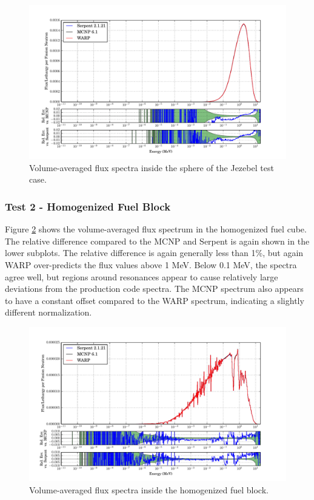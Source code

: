 \documentclass[preprint,12pt]{elsarticle}
\begin{document}
\begin{figure}[h!]
\centering
\includegraphics[width=\textwidth,trim= 1cm 0cm 1cm 0cm]{graphics/jezebel_spec.pdf}
\caption{Volume-averaged flux spectra inside the sphere of the Jezebel test case. \label{jezebel_spec} }
\end{figure}

\newpage
\subsubsection{Test 2 - Homogenized Fuel Block}

Figure \ref{homfuel_spec} shows the volume-averaged flux spectrum in the homogenized fuel cube.  The relative difference compared to the MCNP and Serpent is again shown in the lower subplots.  The relative difference is again generally less than 1\%, but again WARP over-predicts the flux values above 1 MeV.  Below 0.1 MeV, the spectra agree well, but regions around resonances appear to cause relatively large deviations from the production code spectra.  The MCNP spectrum also appears to have a constant offset compared to the WARP spectrum, indicating a slightly different normalization. 

\begin{figure}[h!]
\centering
\includegraphics[width=\textwidth,trim= 1cm 0cm 1cm 0cm]{graphics/homfuel_spec.pdf}
\caption{Volume-averaged flux spectra inside the homogenized fuel block. \label{homfuel_spec} }
\end{figure}
\end{document}
